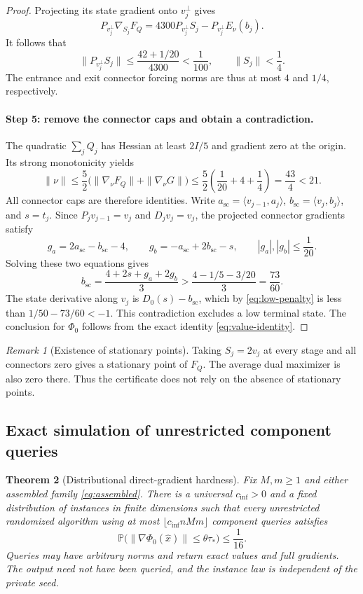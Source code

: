 \documentclass[11pt,letterpaper]{article}
\newtheorem{theorem}{Theorem}[section]
\theoremstyle{definition}
\theoremstyle{remark}
\newtheorem{remark}[theorem]{Remark}
\newcommand{\PP}{\mathbb P}
\begin{document}
\begin{proof}
Projecting its state gradient onto $v_j^\perp$ gives
\[
 P_{v_j^\perp}\nabla_{S_j}F_Q
 =4300P_{v_j^\perp}S_j-P_{v_j^\perp}E_\nu(b_j).
\]
It follows that
\[
 \|P_{v_j^\perp}S_j\|
 \le\frac{42+1/20}{4300}<\frac1{100},
 \qquad \|S_j\|<\frac14.
\]
The entrance and exit connector forcing norms are thus at most $4$ and
$1/4$, respectively.

\paragraph{Step 5: remove the connector caps and obtain a contradiction.}
The quadratic $\sum_jQ_j$ has Hessian at least $2I/5$ and gradient zero at
the origin. Its strong monotonicity yields
\[
 \|\nu\|\le\frac52\bigl(\|\nabla_\nu F_Q\|+
                               \|\nabla_\nu G\|\bigr)
 \le\frac52\left(\frac1{20}+4+\frac14\right)
 =\frac{43}{4}<21.
\]
All connector caps are therefore identities. Write
$a_{\mathrm{sc}}=\langle v_{j-1},a_j\rangle$,
$b_{\mathrm{sc}}=\langle v_j,b_j\rangle$, and $s=t_j$.
Since $P_jv_{j-1}=v_j$ and $D_jv_j=v_j$, the projected connector gradients
satisfy
\[
 g_a=2a_{\mathrm{sc}}-b_{\mathrm{sc}}-4,
 \qquad g_b=-a_{\mathrm{sc}}+2b_{\mathrm{sc}}-s,
 \qquad |g_a|,|g_b|\le\frac1{20}.
\]
Solving these two equations gives
\[
 b_{\mathrm{sc}}=\frac{4+2s+g_a+2g_b}{3}
 >\frac{4-1/5-3/20}{3}=\frac{73}{60}.
\]
The state derivative along $v_j$ is $D_0(s)-b_{\mathrm{sc}}$, which by
\eqref{eq:low-penalty} is less than $1/50-73/60<-1$. This contradiction
excludes a low terminal state. The conclusion for $\Phi_0$ follows from
the exact identity \eqref{eq:value-identity}.
\end{proof}

\begin{remark}[Existence of stationary points]
Taking $S_j=2v_j$ at every stage and all connectors zero gives a stationary
point of $F_Q$. The average dual maximizer is also zero there. Thus the
certificate does not rely on the absence of stationary points.
\end{remark}

\subsection{Exact simulation of unrestricted component queries}

\begin{theorem}[Distributional direct-gradient hardness]
\label{thm:distributional-hardness}
Fix $M,m\ge1$ and either assembled family \eqref{eq:assembled}. There is
a universal $c_{\mathrm{inf}}>0$ and a fixed distribution of instances in
finite dimensions such that every unrestricted randomized algorithm using
at most $\lfloor c_{\mathrm{inf}}nMm\rfloor$ component queries satisfies
\begin{equation}
 \PP\bigl(\|\nabla\Phi_0(\widehat x)\|\le\theta\tau_*\bigr)
 \le\frac1{16}.
 \label{eq:distributional-hardness}
\end{equation}
Queries may have arbitrary norms and return exact values and full gradients.
The output need not have been queried, and the instance law is independent
of the private seed.
\end{theorem}
\end{document}
